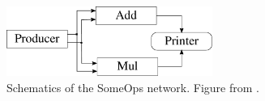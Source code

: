 

\begin{figure}
  \centering
  \includegraphics[width=0.6\textwidth]{figures/someopsnet.pdf}
  \caption{Schematics of the SomeOps network. Figure from \cite{asheim2016vhdl}.}
  \label{fig:someops}
\end{figure}

